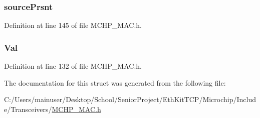 \subsubsection[{source\+Prsnt}]{ source\+Prsnt}\label{struct_m_a_c___r_e_c_e_i_v_e_d___p_a_c_k_e_t_a27dd21605fc04451aca0615da8b21582}


Definition at line 145 of file M\+C\+H\+P\+\_\+\+M\+A\+C.\+h.

\hypertarget{struct_m_a_c___r_e_c_e_i_v_e_d___p_a_c_k_e_t_a5ab8c2bf45b20b5f7aa3a4f083896cec}{}
\subsubsection[{Val}]{ Val}\label{struct_m_a_c___r_e_c_e_i_v_e_d___p_a_c_k_e_t_a5ab8c2bf45b20b5f7aa3a4f083896cec}


Definition at line 132 of file M\+C\+H\+P\+\_\+\+M\+A\+C.\+h.



The documentation for this struct was generated from the following file\+:\begin{DoxyCompactItemize}
\item 
C\+:/\+Users/mainuser/\+Desktop/\+School/\+Senior\+Project/\+Eth\+Kit\+T\+C\+P/\+Microchip/\+Include/\+Transceivers/\hyperlink{_m_c_h_p___m_a_c_8h}{M\+C\+H\+P\+\_\+\+M\+A\+C.\+h}\end{DoxyCompactItemize}
